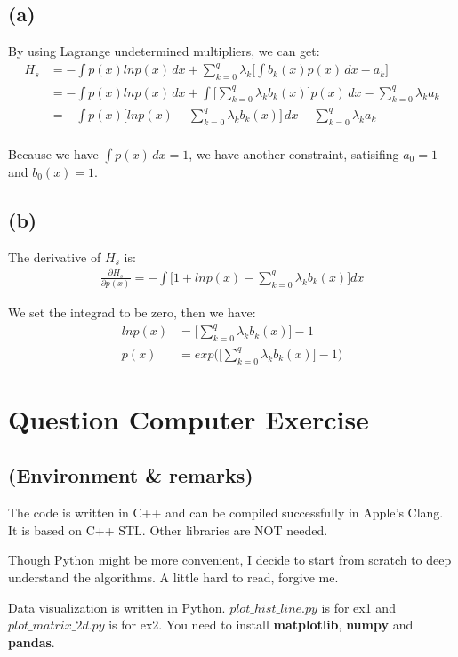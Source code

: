 \documentclass{article}
\newcommand{\question}[1]{\section*{Question #1}}
\renewcommand{\part}[1]{\subsection*{(#1)}}
\begin{document}
\part{a}
By using Lagrange undetermined multipliers, we can get:
\begin{align*}
    H_s &= -\int p(x)lnp(x) \,dx + \displaystyle\sum_{k = 0}^q \lambda_k \bigg[ \int b_k(x)p(x) \,dx - a_k \bigg] \\
    &= -\int p(x)lnp(x) \,dx + \int \bigg[ \displaystyle\sum_{k = 0}^q \lambda_k b_k(x) \bigg]p(x) \,dx - \displaystyle\sum_{k = 0}^q \lambda_k a_k \\
    &= -\int p(x) \bigg[ lnp(x) - \displaystyle\sum_{k = 0}^q \lambda_k b_k(x) \bigg] \,dx - \displaystyle\sum_{k = 0}^q \lambda_k a_k \\
\end{align*} \par
Because we have $\int p(x) \,dx = 1$, we have another constraint, satisifing $a_0 = 1$ and $b_0(x) = 1$. \\
\part{b}
The derivative of $H_s$ is:
\begin{align*}
\frac{\partial H_s}{\partial p(x)} = - \int \bigg[ 1 + lnp(x) - \displaystyle\sum_{k = 0}^q \lambda_k b_k(x) \bigg] dx
\end{align*} \par
We set the integrad to be zero, then we have: \\
\begin{align*}
    lnp(x) &= \bigg[ \displaystyle\sum_{k = 0}^q \lambda_k b_k(x) \bigg] - 1 \\
      p(x) &= exp \bigg( \bigg[ \displaystyle\sum_{k = 0}^q \lambda_k b_k(x) \bigg] - 1 \bigg)
\end{align*}

\question{Computer Exercise}

\part{Environment \& remarks}
The code is written in C++ and can be compiled successfully in Apple's Clang. It is based on C++ STL. Other libraries are NOT needed. \par
Though Python might be more convenient, I decide to start from scratch to deep understand the algorithms. A little hard to read, forgive me. \par
Data visualization is written in Python. $plot\_hist\_line.py$ is for ex1 and $plot\_matrix\_2d.py$ is for ex2. You need to install \textbf{matplotlib}, \textbf{numpy} and \textbf{pandas}.
\end{document}
